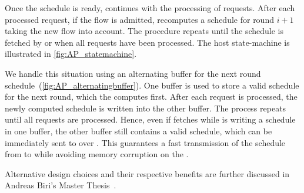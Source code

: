 Once the schedule is ready, \AP continues with the processing of \DRP requests. After each processed request, if the flow is admitted, \AP recomputes a schedule for round $i+1$ taking the new flow into account. The procedure repeats until the schedule is fetched by \CP or when all requests have been processed. The host \AP state-machine is illustrated in \cref{fig:AP_statemachine}.



\pagebreak
We handle this situation using an alternating buffer for the next round schedule~(\cref{fig:AP_alternatingbuffer}). One buffer is used to store a valid schedule for the next round, which the \AP computes first. After each \DRP request is processed, the newly computed schedule is written into the other buffer. The process repeats until all requests are processed.
Hence, even if \CP fetches while \AP is writing a schedule in one buffer, the other buffer still contains a valid schedule, which can be immediately sent to \CP over \bolt.
This guarantees a fast transmission of the schedule from \AP to \CP while avoiding memory corruption on the \AP.

\begin{remark}
  Alternative design choices and their respective benefits are further discussed in Andreas Biri's Master Thesis~\cite{biri2017Unleashing}.
\end{remark}
